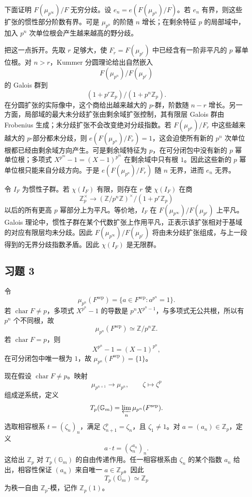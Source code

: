 \documentclass[11pt,a4paper,openany]{ctexbook}
\numberwithin{equation}{chapter}
\newcommand{\Z}{\mathbb{Z}}
\theoremstyle{plain}
\theoremstyle{definition}
\theoremstyle{remark}
\begin{document}
下面证明 $F(\mu_{p^\infty})/F$ 无穷分歧。设 $e_n=e(F(\mu_{p^n})/F)$。若 $e_n$ 有界，则这些扩张的惯性部分阶数有界。可是 $\mu_{p^n}$ 的阶随 $n$ 增长；在剩余特征 $p$ 的局部域中，加入 $p^n$ 次单位根会产生越来越高的野分歧。

把这一点拆开。先取 $r$ 足够大，使 $F_r=F(\mu_{p^r})$ 中已经含有一阶非平凡的 $p$ 幂单位根。对 $n>r$，Kummer 分圆理论给出自然嵌入
\[
F(\mu_{p^n})/F(\mu_{p^r})
\]
的 Galois 群到
\[
(1+p^r\Z_p)/(1+p^n\Z_p).
\]
在分圆扩张的实际像中，这个商给出越来越大的 $p$-群，阶数随 $n-r$ 增长。另一方面，局部域的最大未分歧扩张由剩余域扩张控制，其有限层 Galois 群由 Frobenius 生成；未分歧扩张不会改变绝对分歧指数。若 $F(\mu_{p^n})/F_r$ 中这些越来越大的 $p$-部分都未分歧，则 $e(F(\mu_{p^n})/F_r)=1$，这会迫使所有新的 $p^n$ 次单位根都已经由剩余域方向产生。可是剩余域特征为 $p$，在可分闭包中没有新的 $p$ 幂单位根；多项式 $X^{p^m}-1=(X-1)^{p^m}$ 在剩余域中只有根 $1$。因此这些新的 $p$ 幂单位根只能来自分歧方向。于是 $e(F(\mu_{p^n})/F_r)$ 随 $n$ 无界，进而 $e_n$ 无界。

令 $I_F$ 为惯性子群。若 $\chi(I_F)$ 有限，则存在 $r$ 使 $\chi(I_F)$ 在商
\[
\Z_p^\times\longrightarrow (\Z/p^n\Z)^\times/(1+p^r\Z_p)
\]
以后的所有更高 $p$ 幂部分上为平凡。等价地，$I_F$ 在 $F(\mu_{p^\infty})/F(\mu_{p^r})$ 上平凡。Galois 理论中，惯性子群在某个代数扩张上作用平凡，正表示该扩张相对于基域的对应有限层均未分歧。因此 $F(\mu_{p^\infty})/F(\mu_{p^r})$ 将由未分歧扩张组成，与上一段得到的无界分歧指数矛盾。因此 $\chi(I_F)$ 是无限群。

\subsection*{习题 3}

令
\[
\mu_{p^n}(F^{\mathrm{sep}})=\{a\in F^{\mathrm{sep}}:a^{p^n}=1\}.
\]
若 $\operatorname{char}F\ne p$，多项式 $X^{p^n}-1$ 的导数是 $p^nX^{p^n-1}$，与多项式无公共根，所以有 $p^n$ 个不同根，故
\[
\mu_{p^n}(F^{\mathrm{sep}})\simeq \Z/p^n\Z.
\]
若 $\operatorname{char}F=p$，则
\[
X^{p^n}-1=(X-1)^{p^n},
\]
在可分闭包中唯一根为 $1$，故 $\mu_{p^n}(F^{\mathrm{sep}})=\{1\}$。

现在假设 $\operatorname{char}F\ne p$。映射
\[
\mu_{p^{n+1}}\to\mu_{p^n},\qquad \zeta\mapsto \zeta^p
\]
组成逆系统，定义
\[
T_p(\mathbb G_m)=\varprojlim_n\mu_{p^n}(F^{\mathrm{sep}}).
\]
选取相容根系 $t=(\zeta_n)_n$，满足 $\zeta_{n+1}^p=\zeta_n$，且 $\zeta_1\ne 1$。对 $a=(a_n)\in\Z_p$，定义
\[
a\cdot t=(\zeta_n^{a_n})_n.
\]
这给出 $\Z_p$ 对 $T_p(\mathbb G_m)$ 的自由传递作用。任一相容根系由 $\zeta_n$ 的某个指数 $a_n$ 给出，相容性保证 $(a_n)$ 来自唯一 $a\in\Z_p$。因此
\[
T_p(\mathbb G_m)\simeq \Z_p
\]
为秩一自由 $\Z_p$-模，记作 $\Z_p(1)$。
\end{document}
